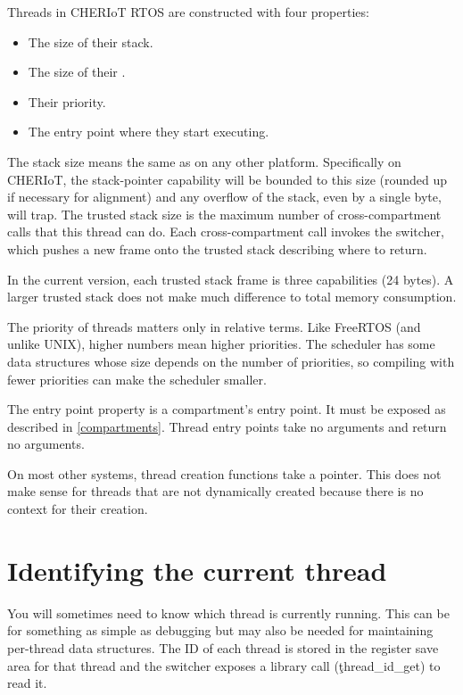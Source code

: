 Threads in CHERIoT RTOS are constructed with four properties:

\begin{itemize}
	\item{The size of their stack.}
	\item{The size of their .}
	\item{Their priority.}
	\item{The entry point where they start executing.}
\end{itemize}

The stack size means the same as on any other platform.
Specifically on CHERIoT, the stack-pointer capability will be bounded to this size (rounded up if necessary for alignment) and any overflow of the stack, even by a single byte, will trap.
The trusted stack size is the maximum number of cross-compartment calls that this thread can do.
Each cross-compartment call invokes the switcher, which pushes a new frame onto the trusted stack describing where to return.

\begin{note}
In the current version, each trusted stack frame is three capabilities (24 bytes).
A larger trusted stack does not make much difference to total memory consumption.
\end{note}

The priority of threads matters only in relative terms.
Like FreeRTOS (and unlike UNIX), higher numbers mean higher priorities.
The scheduler has some data structures whose size depends on the number of priorities, so compiling with fewer priorities can make the scheduler smaller.

The entry point property is a compartment's entry point.
It must be exposed as described in \ref{compartments}.
Thread entry points take no arguments and return no arguments.

On most other systems, thread creation functions take a pointer.
This does not make sense for threads that are not dynamically created because there is no context for their creation.

\section{Identifying the current thread}

You will sometimes need to know which thread is currently running.
This can be for something as simple as debugging but may also be needed for maintaining per-thread data structures.
The ID of each thread is stored in the register save area for that thread and the switcher exposes a library call (\c{thread_id_get}) to read it.

